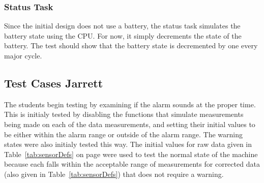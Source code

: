 \documentclass[12pt]{article} %
\begin{document}
\subsubsection{Status Task}
Since the initial design does not use a battery, the status task simulates the
battery state using the CPU.  For now, it simply decrements the state of the
battery.  The test should show that the battery state is decremented by one
every major cycle.

\subsection{Test Cases  Jarrett}

The students begin testing by examining if the alarm sounds at the proper time.
This is initialy tested by disabling the functions that simulate measurements
being made on each of the data measurements, and setting their initial values
to be either within the alarm range or outside of the alarm range. The warning
states were also initialy tested this way. The initial values for raw data
given in Table~\ref{tab:sensorDefs} on page \pageref{tab:sensorDefs} were used
to test the normal state of the machine because each falls within the
acceptable range of measurements for corrected data (also given in
Table~\ref{tab:sensorDefs}) that does not require a warning.
	
\end{document}
